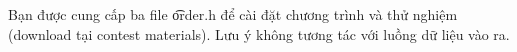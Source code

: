 Bạn được cung cấp ba file \t{order.h} để cài đặt chương trình và thử nghiệm (download tại contest materials). Lưu ý không tương tác với luồng dữ liệu vào ra. 